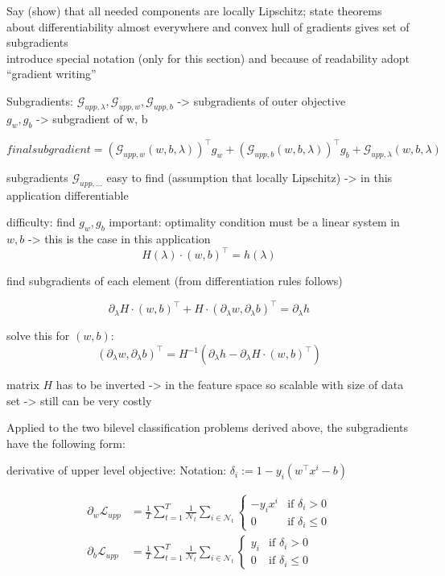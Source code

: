 Say (show) that all needed components are locally Lipschitz; state theorems about differentiability almost everywhere and convex hull of gradients gives set of subgradients\\
introduce special notation (only for this section) and because of readability adopt ``gradient writing''

Subgradients:
\(\mathcal{G}_{upp,\lambda}, \mathcal{G}_{upp,w},\mathcal{G}_{upp,b}\) -> subgradients of outer objective \\
\(g_w, g_b\) -> subgradient of w, b

\[ final subgradient = \left(\mathcal{G}_{upp,w}(w,b,\lambda)\right)^{\top}g_w+\left(\mathcal{G}_{upp,b}(w,b,\lambda)\right)^{\top}g_b+\mathcal{G}_{upp,\lambda}(w,b,\lambda) 
\label{subgr_upp}\]

subgradients \(\mathcal{G}_{upp,...}\) easy to find (assumption that locally Lipschitz) -> in this application differentiable

difficulty: find \(g_w, g_b\)
important: optimality condition must be a linear system in \(w,b\) -> this is the case in this application
\[ H(\lambda)\cdot (w,b)^{\top} = h(\lambda) \]

find subgradients of each element (from differentiation rules follows)

\[ \partial_{\lambda} H\cdot (w,b)^{\top} + H \cdot(\partial_{\lambda} w, \partial_{\lambda} b)^{\top} = \partial_{\lambda} h  \]

solve this for \((w,b)\):
\[ (\partial_{\lambda} w, \partial_{\lambda}b)^{\top} = H^{-1}\left(\partial_{\lambda}h-\partial_{\lambda} H \cdot(w,b)^{\top}\right) \]

matrix \(H\) has to be inverted -> in the feature space so scalable with size of data set -> still can be very costly \cite{Moore2011}

Applied to the two bilevel classification problems derived above, the subgradients have the following form:

derivative of upper level objective:
Notation: \(\delta_i := 1-y_i(w^{\top}x^i-b)\)

\begin{align}
	\partial_{w}\mathcal{L}_{upp}&= \frac{1}{T}\sum_{t=1}^T\frac{1}{\mathcal{N}_t}\sum_{i \in \mathcal{N}_t}{\left\{\begin{array}{cl} -y_ix^i & \text{if } \delta_i >0 \\ 0 & \text{if } \delta_i \leq 0 \end{array} \right.} \\
	\partial_{b}\mathcal{L}_{upp}&= \frac{1}{T}\sum_{t=1}^T\frac{1}{\mathcal{N}_t}\sum_{i \in \mathcal{N}_t}{\left\{\begin{array}{cl} y_i & \text{if } \delta_i >0 \\ 0 & \text{if } \delta_i \leq 0 \end{array} \right.}
	\end{align}
	
